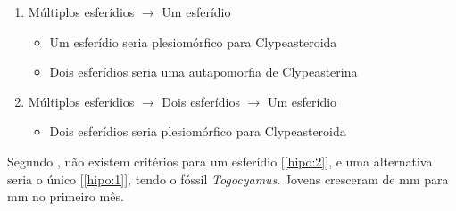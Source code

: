 \begin{enumerate}
  \item{Múltiplos esferídios $\longrightarrow$ Um esferídio}\label{hipo:1}
    \begin{itemize}
      \item{Um esferídio seria plesiomórfico para Clypeasteroida}
      \item{Dois esferídios seria uma autapomorfia de Clypeasterina}
    \end{itemize}
  \item{Múltiplos esferídios $\longrightarrow$ Dois esferídios $\longrightarrow$ Um esferídio}\label{hipo:2}
    \begin{itemize}
      \item{Dois esferídios seria plesiomórfico para Clypeasteroida}
    \end{itemize}
\end{enumerate}

Segundo \citet{Mooi1990}, não existem critérios para um esferídio [\ref{hipo:2}], e uma alternativa seria o único [\ref{hipo:1}], tendo o fóssil \emph{Togocyamus}.
Jovens cresceram de \unit[0,35]{mm} para \unit[3,80]{mm} no primeiro mês.


